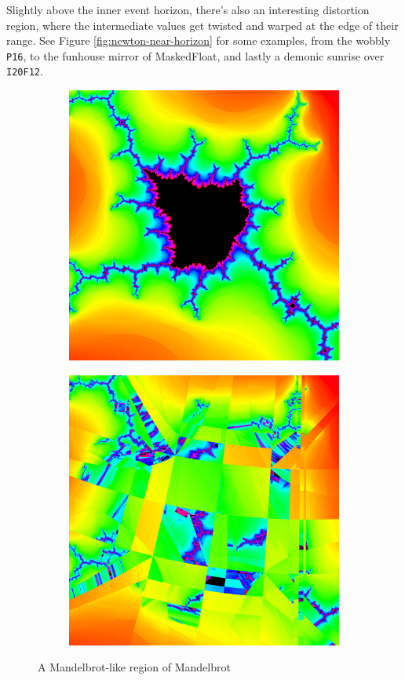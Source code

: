 \documentclass[sigconf,authorversion,nonacm]{acmart}
\begin{document}
Slightly above the inner event horizon, there's also an interesting distortion region, 
where the intermediate values get twisted and warped at the edge of their range.
See Figure \ref{fig:newton-near-horizon} for some examples, from the wobbly 
\texttt{P16}, to the
funhouse mirror of MaskedFloat, and lastly a demonic sunrise over \texttt{I20F12}.


\begin{figure}
    \begin{subfigure}[MaskedFloat<4,50>]
        \centering
        \includegraphics[width=0.45\linewidth]{images/4-starburst/mf4.png}
    \end{subfigure}
    \quad
        \begin{subfigure}[MaskedFloat<3,50>]
        \centering
        \includegraphics[width=0.45\linewidth]{images/4-starburst/mf3.png}
    \end{subfigure}
    \caption{A Mandelbrot-like region of Mandelbrot}
    \label{fig:4-hyperbole}
\end{figure}

\setcounter{subsection}{712890624}
\end{document}
